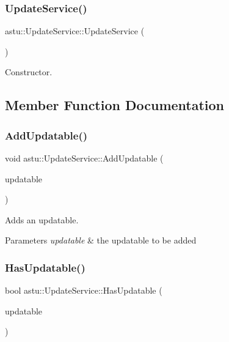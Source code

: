 \subsubsection{\texorpdfstring{Update\+Service()}{UpdateService()}}
{\footnotesize\ttfamily astu\+::\+Update\+Service\+::\+Update\+Service (\begin{DoxyParamCaption}{ }\end{DoxyParamCaption})}

Constructor. 

\subsection{Member Function Documentation}
\mbox{\label{classastu_1_1UpdateService_a83ff161f4280681a50b728e2ac157cf6}} 
\subsubsection{\texorpdfstring{Add\+Updatable()}{AddUpdatable()}}
{\footnotesize\ttfamily void astu\+::\+Update\+Service\+::\+Add\+Updatable (\begin{DoxyParamCaption}\item[{std\+::shared\+\_\+ptr$<$ \hyperlink{classastu_1_1IUpdatable}{I\+Updatable} $>$}]{updatable }\end{DoxyParamCaption})}

Adds an updatable.


\begin{DoxyParams}{Parameters}
{\em updatable} & the updatable to be added \\
\hline
\end{DoxyParams}
\mbox{\label{classastu_1_1UpdateService_aaffeece0ab9fd8fff1020763cd72de13}} 
\subsubsection{\texorpdfstring{Has\+Updatable()}{HasUpdatable()}}
{\footnotesize\ttfamily bool astu\+::\+Update\+Service\+::\+Has\+Updatable (\begin{DoxyParamCaption}\item[{std\+::shared\+\_\+ptr$<$ \hyperlink{classastu_1_1IUpdatable}{I\+Updatable} $>$}]{updatable }\end{DoxyParamCaption})}

